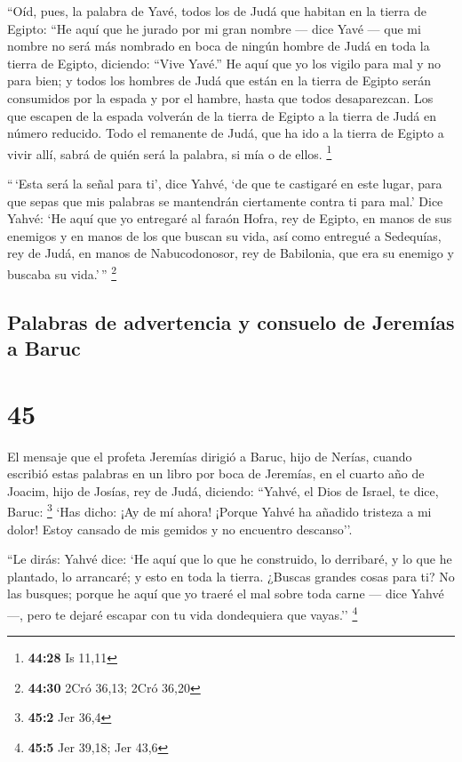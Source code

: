  ``Oíd, pues, la palabra de Yavé, todos los de Judá que
habitan en la tierra de Egipto: ``He aquí que he jurado por mi gran
nombre --- dice Yavé --- que mi nombre no será más nombrado en boca de
ningún hombre de Judá en toda la tierra de Egipto, diciendo: ``Vive
Yavé.''  He aquí que yo los vigilo para mal y no para
bien; y todos los hombres de Judá que están en la tierra de Egipto serán
consumidos por la espada y por el hambre, hasta que todos desaparezcan.
 Los que escapen de la espada volverán de la tierra de
Egipto a la tierra de Judá en número reducido. Todo el remanente de
Judá, que ha ido a la tierra de Egipto a vivir allí, sabrá de quién será
la palabra, si mía o de ellos. \footnote{\textbf{44:28} Is 11,11}

 ``\,`Esta será la señal para ti', dice Yahvé, `de que te
castigaré en este lugar, para que sepas que mis palabras se mantendrán
ciertamente contra ti para mal.'  Dice Yahvé: `He aquí
que yo entregaré al faraón Hofra, rey de Egipto, en manos de sus
enemigos y en manos de los que buscan su vida, así como entregué a
Sedequías, rey de Judá, en manos de Nabucodonosor, rey de Babilonia, que
era su enemigo y buscaba su vida.'\,'' \footnote{\textbf{44:30} 2Cró
  36,13; 2Cró 36,20}

\hypertarget{palabras-de-advertencia-y-consuelo-de-jeremuxedas-a-baruc}{%
\subsection{Palabras de advertencia y consuelo de Jeremías a
Baruc}\label{palabras-de-advertencia-y-consuelo-de-jeremuxedas-a-baruc}}

\hypertarget{section-44}{%
\section{45}\label{section-44}}

 El mensaje que el profeta Jeremías dirigió a Baruc, hijo
de Nerías, cuando escribió estas palabras en un libro por boca de
Jeremías, en el cuarto año de Joacim, hijo de Josías, rey de Judá,
diciendo:  ``Yahvé, el Dios de Israel, te dice, Baruc:
\footnote{\textbf{45:2} Jer 36,4}  `Has dicho: ¡Ay de mí
ahora! ¡Porque Yahvé ha añadido tristeza a mi dolor! Estoy cansado de
mis gemidos y no encuentro descanso''.

 ``Le dirás: Yahvé dice: `He aquí que lo que he
construido, lo derribaré, y lo que he plantado, lo arrancaré; y esto en
toda la tierra.  ¿Buscas grandes cosas para ti? No las
busques; porque he aquí que yo traeré el mal sobre toda carne --- dice
Yahvé ---, pero te dejaré escapar con tu vida dondequiera que vayas.''
\footnote{\textbf{45:5} Jer 39,18; Jer 43,6}

